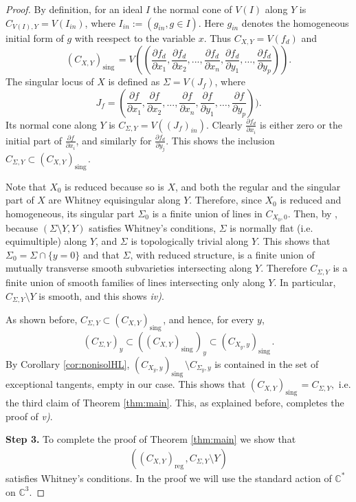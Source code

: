 \documentclass[12pt]{amsart}
\theoremstyle{definition}
\numberwithin{equation}{section}
\newcommand{\C}{\mathbb{C}}
\DeclareMathOperator{\sing}{sing \, }
\DeclareMathOperator{\reg}{reg\,}
\begin{document}
\begin{proof}
By definition, for an ideal $I$ the normal cone of $V(I)$ along $Y$ is  
$C_{V(I),Y}=V(I_{in})$, where $I_{in}:=(g_{in}, g\in I)$.  Here $g_{in}$ denotes the homogeneous initial form of $g$ with reespect to the variable $x$.  
Thus $C_{X,Y} = V(f_d)$ and 
$$
(C_{X,Y})_{\sing}=V((\frac{\partial f_d}{\partial x_1}, \frac{\partial f_d}{\partial x_2}, ..., \frac{\partial f_d}{\partial x_n}, \frac{\partial f_d}{\partial y_1}, \ldots  , \frac{\partial f_d}{\partial y_p}))
. $$
The singular locus of $X$ is defined as $\Sigma =V(J_{f})$, where 
$$
J_{f}=(\frac{\partial f}{\partial x_1}, \frac{\partial f}{\partial x_2}, ..., \frac{\partial f}{\partial x_n}, \frac{\partial f}{\partial y_1}, \ldots , \frac{\partial f}{\partial y_p})).
$$
 Its normal cone along $Y$ is $C_{\Sigma,Y}=V((J_f)_{in})$.   
Clearly $\frac{\partial f_d}{\partial x_i}$ is either zero or the initial part of 
$\frac{\partial f}{\partial x_i}$, and similarly for $\frac{\partial f_d}{\partial y_j}$.  
This shows the inclusion $C_{\Sigma,Y}\subset (C_{X,Y})_{\sing}$.

Note that $X_0$ is reduced because so is $X$, and both the regular and the singular part of $X $ are Whitney equisingular along $Y$.  Therefore, since $X_0$ is reduced and homogeneous,  its singular part $\Sigma_0$  is a finite union of lines in $C_{X_0,0}$.  Then, by \cite{Hi70}, because $(\Sigma \setminus Y, Y)$ satisfies Whitney's conditions, $\Sigma$ is normally flat (i.e. equimultiple) along $Y$, and $\Sigma$ is topologically trivial along $Y$.  This shows that $\Sigma_0= \Sigma\cap \{y=0\}$ and that $\Sigma$, with reduced structure, is a finite union of mutually transverse smooth subvarieties intersecting along $Y$.  Therefore $C_{\Sigma,Y}$  is a finite union of smooth families of lines intersecting only along $Y$. 
In particular, $C_{\Sigma,Y}\setminus Y$ is smooth,  and this shows \emph{iv)}. 

As shown before, $C_{\Sigma,Y} \subset (C_{X,Y})_{\sing}$, and hence,  for every $y$,  
$$ 
(C_{\Sigma,Y})_y \subset ((C_{X,Y})_{\sing})_y \subset (C_{X_{y},y})_{\sing} . 
$$
 By Corollary \ref{cor:nonisolHL},   
  $(C_{X_{y},y})_{\sing}\setminus C_{\Sigma_y,y}$ is contained in the set of exceptional tangents, empty in our case. This shows that $(C_{X,Y})_{\sing}=C_{\Sigma,Y},$ i.e.
the third claim of Theorem \ref{thm:main}.   This, as explained before, completes the proof of \emph{v)}.

\bigskip
\noindent
{\bf Step 3.}
To complete the proof of Theorem \ref{thm:main} we show that 
\begin{align}\label{eqn:lastWhitney}
((C_{X,Y})_{\reg}, C_{\Sigma,Y} \setminus Y)
\end{align} 
satisfies Whitney's conditions.  In the proof we will use the standard 
action of $\C^*$ on $\C^3$.


\end{proof}
\end{document}
